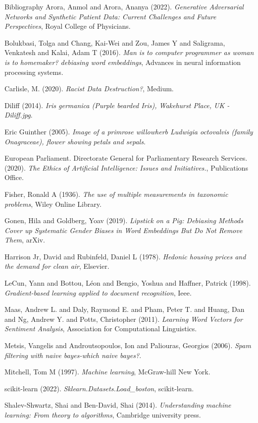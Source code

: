 \documentclass[10pt]{beamer}
\begin{document}
\begin{frame}[fragile,allowframebreaks,label=]{Bibliography}
\noindent
Arora, Anmol and Arora, Ananya (2022). \emph{Generative Adversarial Networks and Synthetic Patient Data: Current Challenges and Future Perspectives}, {Royal College of Physicians}.

\noindent
Bolukbasi, Tolga and Chang, Kai-Wei and Zou, James Y and Saligrama, Venkatesh and Kalai, Adam T (2016). \emph{Man is to computer programmer as woman is to homemaker? debiasing word embeddings}, Advances in neural information processing systems.

\noindent
Carlisle, M. (2020). \emph{Racist Data Destruction?}, Medium.

\noindent
Diliff (2014). \emph{Iris germanica (Purple bearded Iris), Wakehurst Place, UK - Diliff.jpg}.

\noindent
Eric Guinther (2005). \emph{Image of a primrose willowherb Ludwigia octovalvis (family Onagraceae), flower showing petals and sepals}.

\noindent
{European Parliament. Directorate General for Parliamentary Research Services.} (2020). \emph{The Ethics of Artificial Intelligence: Issues and Initiatives.}, {Publications Office}.

\noindent
Fisher, Ronald A (1936). \emph{The use of multiple measurements in taxonomic problems}, Wiley Online Library.

\noindent
Gonen, Hila and Goldberg, Yoav (2019). \emph{Lipstick on a {{Pig}}: {{Debiasing Methods Cover}} up {{Systematic Gender Biases}} in {{Word Embeddings But}} Do Not {{Remove Them}}}, {arXiv}.

\noindent
Harrison Jr, David and Rubinfeld, Daniel L (1978). \emph{Hedonic housing prices and the demand for clean air}, Elsevier.

\noindent
LeCun, Yann and Bottou, L{\'e}on and Bengio, Yoshua and Haffner, Patrick (1998). \emph{Gradient-based learning applied to document recognition}, Ieee.

\noindent
Maas, Andrew L. and Daly, Raymond E. and Pham, Peter T. and Huang, Dan and Ng, Andrew Y. and Potts, Christopher (2011). \emph{Learning Word Vectors for Sentiment Analysis}, Association for Computational Linguistics.

\noindent
Metsis, Vangelis and Androutsopoulos, Ion and Paliouras, Georgios (2006). \emph{Spam filtering with naive bayes-which naive bayes?}.

\noindent
Mitchell, Tom M (1997). \emph{Machine learning}, McGraw-hill New York.

\noindent
scikit-learn (2022). \emph{Sklearn.Datasets.Load\_boston}, scikit-learn.

\noindent
Shalev-Shwartz, Shai and Ben-David, Shai (2014). \emph{Understanding machine learning: From theory to algorithms}, Cambridge university press.
\end{frame}
\end{document}
